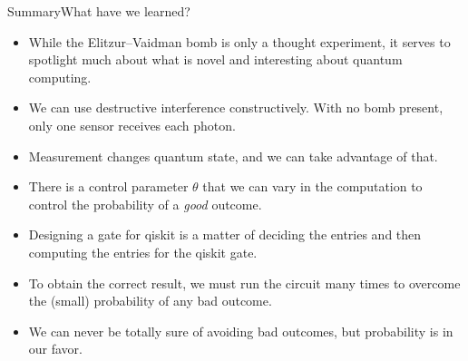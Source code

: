 \begin{frame}{Summary}{What have we learned?}

\begin{itemize}[<+->]
    \item While the Elitzur--Vaidman bomb is only a thought experiment, it serves to spotlight much about what is novel and interesting about quantum computing.
    \item We can use destructive interference constructively.  With no bomb present, only one sensor receives each photon.
    \item Measurement changes quantum state, and we can take advantage of that.
    \item There is a control parameter $\theta$ that we can vary in the computation to control the probability of a \emph{good} outcome.
    \item Designing a gate for qiskit is a matter of deciding the entries and then computing the entries for the qiskit  gate.
    \item To obtain the correct result, we must run the circuit many times to overcome the (small) probability of any bad outcome.
    \item We can never be totally sure of avoiding bad outcomes, but probability is in our favor.
\end{itemize}
    
\end{frame}
